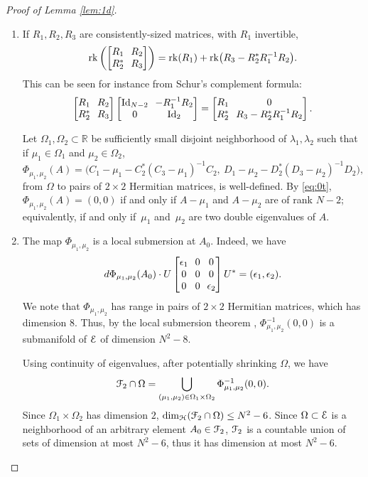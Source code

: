 \documentclass[11pt]{article}
\numberwithin{equation}{section}
\let\pazocal\EuScript
\theoremstyle{definition}
\DeclareMathOperator{\Id}{Id}
\DeclareMathOperator{\rk}{rk}
\newcommand{\FF}{\pazocal{F}}
\newcommand{\EE}{\pazocal{E}}
\newcommand{\HH}{\pazocal{H}}
\newcommand{\R}{\mathbb{R}}
\newcommand{\matrice}[1]{\arraycolsep3.5pt\begin{bmatrix}#1\end{bmatrix}}
\begin{document}
\begin{proof}[Proof of Lemma \ref{lem:1d}]
\begin{enumerate}
\item
If $R_1, R_2, R_3$ are consistently-sized matrices, with $R_1$ invertible,
\begin{equation*}
\rk \left(\matrice{R_1 & R_2 \\ R_2^* & R_3} \right) = \rk(R_1)+ \rk \bigl(R_3-R_2^* R_1^{-1}R_2\bigr).
\end{equation*}
This can be seen for instance from Schur's complement formula:
\begin{equation}\label{eq:0t}
\matrice{R_1 & R_2 \\ R_2^* & R_3} \matrice{\Id_{N-2} & -R_1^{-1}R_2 \\ 0 & \Id_2 } = \matrice{R_1 & 0 \\ R_2^* & R_3-R_2^* R_1^{-1}R_2}.
\end{equation}

Let $\Omega_1, \Omega_2 \subset \R$ be sufficiently small disjoint neighborhood of $\lambda_1, \lambda_2$ such that if $\mu_1 \in \Omega_1$ and $\mu_2 \in \Omega_2$,
\begin{equation*}
\Phi_{\mu_1,\mu_2}(A) = \bigl( C_1 - \mu_1 - C_2^* (C_3-\mu_1)^{-1} C_2, \ D_1 - \mu_2 - D_2^* (D_3-\mu_2)^{-1} D_2 \bigr),
\end{equation*}
from $\Omega$ to pairs of $2 \times 2$ Hermitian matrices, is well-defined. By \eqref{eq:0t}, $\Phi_{\mu_1,\mu_2}(A) = (0,0)$ if and only if $A-\mu_1$ and $A - \mu_2$ are of rank $N-2$; equivalently, if and only if~$\mu_1$ and~$\mu_2$ are two double eigenvalues of $A$.

\item
The map $\Phi_{\mu_1,\mu_2}$ is a local submersion at $A_0$. Indeed, we have
\begin{equation*}
d\Phi_{\mu_1,\mu_2}(A_0) \cdot U \matrice{\epsilon_1 & 0 & 0 \\ 0 & 0 & 0 \\ 0 & 0 & \epsilon_2 }U^* = (\epsilon_1,\epsilon_2).
\end{equation*}
We note that $\Phi_{\mu_1,\mu_2}$ has range in pairs of $2 \times 2$ Hermitian matrices, which has dimension $8$. Thus, by the local submersion theorem \cite[\S4]{GP74}, $\Phi_{\mu_1,\mu_2}^{-1}(0,0)$ is a submanifold of $\EE$ of dimension $N^2-8$.

Using continuity of eigenvalues, after potentially shrinking $\Omega$, we have
\begin{equation*}
\FF_2 \cap \Omega = \bigcup_{(\mu_1,\mu_2) \in \Omega_1 \times \Omega_2} \Phi_{\mu_1,\mu_2}^{-1}(0,0).
\end{equation*}
Since $\Omega_1 \times \Omega_2$ has dimension $2$, $\dim_\HH(\FF_2 \cap \Omega) \leq N^2-6$. Since $\Omega \subset \EE$ is a neighborhood of an arbitrary element $A_0 \in \FF_2$, $\FF_2$ is a countable union of sets of dimension at most $N^2-6$, thus it has dimension at most $N^2-6$.\qedhere
\end{enumerate}
\end{proof}
\end{document}
